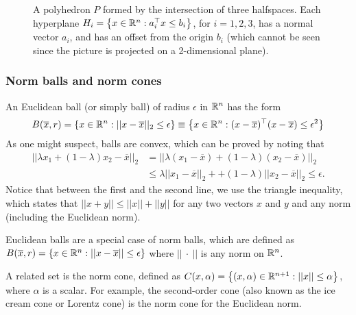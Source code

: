 	\begin{figure}[H]
    \caption{A polyhedron $P$ formed by the intersection of three halfspaces. Each hyperplane $H_i = \left\{ x \in \mathbb{R}^n : a_i^\top x \leq b_i \right \}$, for $i = 1,2,3$, has a normal vector $a_i$, and has an offset from the origin $b_i$ (which cannot be seen since the picture is projected on a 2-dimensional plane).} \label{fig:polyhedral_set}
\end{figure}

\subsubsection{Norm balls and norm cones}

An Euclidean ball (or simply ball) of radius $\epsilon$ in $\mathbb{R}^n$ has the form
%
\begin{equation*}
	B(\overline{x}, r) = \left\{ x \in \mathbb{R}^n : || x - \overline{x}||_2 \le \epsilon \right \} \equiv \left\{ x \in \mathbb{R}^n : (x - \overline{x})^\top (x - \overline{x}) \le \epsilon^2 \right \}
\end{equation*}
%
As one might suspect, balls are convex, which can be proved by noting that
%
\begin{align*}
	||\lambda x_1 + (1 - \lambda) x_2 - \overline{x}||_2  & = ||\lambda (x_1 - \overline{x}) + (1 - \lambda) (x_2 - \overline{x})||_2 \\
	& \le \lambda ||x_1 - \overline{x}||_2 + + (1 - \lambda) ||x_2 - \overline{x}||_2 \le \epsilon.
\end{align*}
%
Notice that between the first and the second line, we use the triangle inequality, which states that $||x + y|| \le ||x|| + ||y||$ for any two vectors $x$ and $y$ and any norm (including the Euclidean norm). 

Euclidean balls are a special case of norm balls, which are defined as $B(\overline{x}, r) = \left\{ x \in \mathbb{R}^n : || x - \overline{x}|| \le \epsilon \right \}$ where $||\ \cdot \ ||$ is any norm on $\mathbb{R}^n$. 

A related set is the norm cone, defined as $C(x, \alpha) = \left\{ (x,\alpha) \in \mathbb{R}^{n+1} : ||x|| \le \alpha \right \}$, where $\alpha$ is a scalar. For example, the second-order cone (also known as the ice cream cone or Lorentz cone) is the norm cone for the Euclidean norm.

